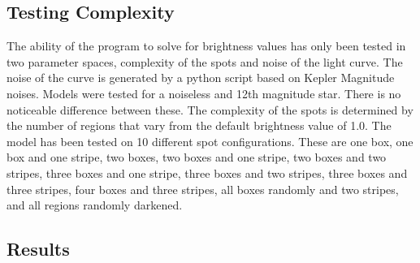 \documentclass[iop]{emulateapj}
\begin{document}
\subsection{Testing Complexity \label{complexity}}
The ability of the program to solve for brightness values has only been tested in two parameter spaces, complexity of the spots and noise of the light curve. The noise of the curve is generated by a python script based on Kepler Magnitude noises. Models were tested for a noiseless and 12th magnitude star. There is no noticeable difference between these.
The complexity of the spots is determined by the number of regions that vary from the default brightness value of 1.0. The model has been tested on 10 different spot configurations. These are one box, one box and one stripe, two boxes, two boxes and one stripe, two boxes and two stripes, three boxes and one stripe, three boxes and two stripes, three boxes and three stripes, four boxes and three stripes, all boxes randomly and two stripes, and all regions randomly darkened.
\subsection{Results \label{results}}
\end{document}
